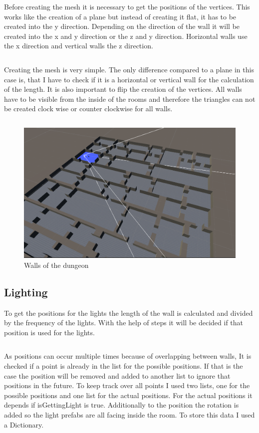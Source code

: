 \documentclass[a4paper,11pt,oneside]{scrreprt}
\begin{document}
Before creating the mesh it is necessary to get the positions of the vertices. This works like the creation of a plane but instead of creating it flat, it has to be created into the y direction. Depending on the direction of the wall it will be created into the x and y direction or the z and y direction. Horizontal walls use the x direction and vertical walls the z direction. 
\inputminted[fontsize=\footnotesize,linenos]{csharp}{code/CreateWalls2.cs}

\newpage
Creating the mesh is very simple. The only difference compared to a plane in this case is, that I have to check if it is a horizontal or vertical wall for the calculation of the length. It is also important to flip the creation of the vertices. All walls have to be visible from the inside of the rooms and therefore the triangles can not be created clock wise or counter clockwise for all walls.
\inputminted[fontsize=\footnotesize,linenos]{csharp}{code/CreateWalls3.cs}

\begin{figure}[htb]
	\centering
	\includegraphics[scale=0.7]{images/walls.png}   
	\caption{Walls of the dungeon}
	\label{fig:walls}
\end{figure}

\subsection{Lighting}
To get the positions for the lights the length of the wall is calculated and divided by the frequency of the lights. With the help of steps it will be decided if that position is used for the lights. 
\inputminted[fontsize=\footnotesize,linenos]{csharp}{code/Lights1.cs}

As positions can occur multiple times because of overlapping between walls, It is checked if a point is already in the list for the possible positions. If that is the case the position will be removed and added to another list to ignore that positions in the future. To keep track over all points I used two lists, one for the possible positions and one list for the actual positions. For the actual positions it depends if isGettingLight is true. Additionally to the position the rotation is added so the light prefabs are all facing inside the room. To store this data I used a Dictionary. 
\inputminted[fontsize=\footnotesize,linenos]{csharp}{code/Lights2.cs}
\end{document}
